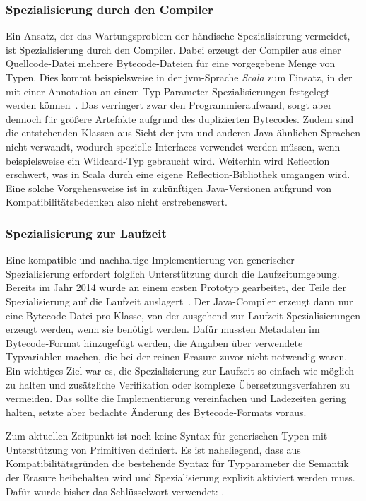\subsubsection{Spezialisierung durch den Compiler}

Ein Ansatz, der das Wartungsproblem der händische Spezialisierung vermeidet, ist Spezialisierung durch den Compiler.
Dabei erzeugt der Compiler aus einer Quellcode-Datei mehrere Bytecode-Dateien für eine vorgegebene Menge von Typen.
Dies kommt beispielsweise in der \ac{jvm}-Sprache \emph{Scala} zum Einsatz, in der mit einer Annotation an einem Typ-Parameter Spezialisierungen festgelegt werden können~\cite{scala-specialized}.
Das verringert zwar den Programmieraufwand, sorgt aber dennoch für größere Artefakte aufgrund des duplizierten Bytecodes.
Zudem sind die entstehenden Klassen aus Sicht der \ac{jvm} und anderen Java-ähnlichen Sprachen nicht verwandt, wodurch spezielle Interfaces verwendet werden müssen, wenn beispielsweise ein Wildcard-Typ gebraucht wird.
Weiterhin wird Reflection erschwert, was in Scala durch eine eigene Reflection-Bibliothek umgangen wird.
Eine solche Vorgehensweise ist in zukünftigen Java-Versionen aufgrund von Kompatibilitätsbedenken also nicht erstrebenswert.

\subsubsection{Spezialisierung zur Laufzeit}

Eine kompatible und nachhaltige Implementierung von generischer Spezialisierung erfordert folglich Unterstützung durch die Laufzeitumgebung.
Bereits im Jahr 2014 wurde an einem ersten Prototyp gearbeitet, der Teile der Spezialisierung auf die Laufzeit auslagert~\cite{specialization}.
Der Java-Compiler erzeugt dann nur eine Bytecode-Datei pro Klasse, von der ausgehend zur Laufzeit Spezialisierungen erzeugt werden, wenn sie benötigt werden.
Dafür mussten Metadaten im Bytecode-Format hinzugefügt werden, die Angaben über verwendete Typvariablen machen, die bei der reinen Erasure zuvor nicht notwendig waren.
Ein wichtiges Ziel war es, die Spezialisierung zur Laufzeit so einfach wie möglich zu halten und zusätzliche Verifikation oder komplexe Übersetzungsverfahren zu vermeiden.
Das sollte die Implementierung vereinfachen und Ladezeiten gering halten, setzte aber bedachte Änderung des Bytecode-Formats voraus.

Zum aktuellen Zeitpunkt ist noch keine Syntax für generischen Typen mit Unterstützung von Primitiven definiert.
Es ist naheliegend, dass aus Kompatibilitätsgründen die bestehende Syntax für Typparameter die Semantik der Erasure beibehalten wird und Spezialisierung explizit aktiviert werden muss.
Dafür wurde bisher das Schlüsselwort  verwendet: .

